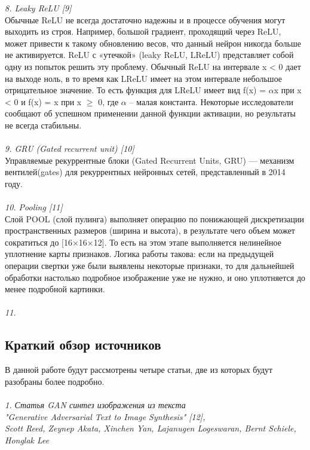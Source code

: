 \documentclass{article}
\begin{document}
    \textit{8. Leaky ReLU [9]}
    \\
    Обычные ReLU не всегда достаточно надежны и в процессе обучения могут выходить из строя. Например, большой градиент, проходящий через ReLU, может привести к такому обновлению весов, что данный нейрон никогда больше не активируется. 
    ReLU с «утечкой» (leaky ReLU, LReLU) представляет собой одну из попыток решить эту проблему. Обычный ReLU на интервале x < 0 дает на выходе ноль, в то время как LReLU имеет на этом интервале небольшое отрицательное значение. То есть функция для LReLU имеет вид  f(x) = $\alpha$x при x < 0 и f(x) = x при x $\geqslant$ 0, где $\alpha$ – малая константа. Некоторые исследователи сообщают об успешном применении данной функции активации, но результаты не всегда стабильны.
    \\ \\
    \textit{9. GRU (Gated recurrent unit) [10]}
    \\
    Управляемые рекуррентные блоки (Gated Recurrent Units, GRU) — механизм вентилей(gates) для рекуррентных нейронных сетей, представленный в 2014 году. 
    \\ \\
    \textit{10. Pooling [11]}
    \\
    Слой POOL (слой пулинга) выполняет операцию по понижающей дискретизации пространственных размеров (ширина и высота), в результате чего объем может сократиться до [16×16×12]. То есть на этом этапе выполняется нелинейное уплотнение карты признаков. Логика работы такова: если на предыдущей операции свертки уже были выявлены некоторые признаки, то для дальнейшей обработки настолько подробное изображение уже не нужно, и оно уплотняется до менее подробной картинки.
    \\ \\
    \textit{11. }
    \newpage
    \begin{center} 
    \section{Краткий обзор источников}
    \end{center}
    \large 
    В данной работе будут рассмотрены четыре статьи, две из которых будут разобраны более подробно.
    \\ \\
    \textit{1. Статья GAN синтез изображения из текста
    \\
    "Generative Adversarial Text to Image Synthesis" [12], 
    \\
    Scott Reed, Zeynep Akata, Xinchen Yan, Lajanugen Logeswaran, Bernt Schiele, Honglak Lee}
    \\
\end{document}
